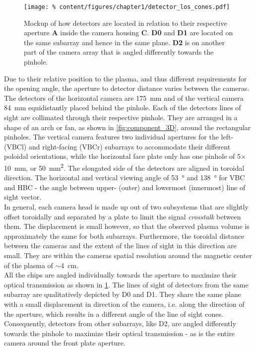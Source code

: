 %
            \begin{figure}[t]%
                \centering%
                \texttt{[image: \%
                    content/figures/chapter1/detector\_los\_cones.pdf]}%
                \caption{Mockup of how detectors are located in relation to their respective aperture \textbf{A} inside the camera housing \textbf{C}. \textbf{D0} and \textbf{D1} are located on the same subarray and hence in the same plane. \textbf{D2} is on another part of the camera array that is angled differently towards the pinhole.}\label{fig:loscones}%
            \end{figure}%
%
            Due to their relative position to the plasma, and thus different requirements for the opening angle, the aperture to detector distance varies between the cameras. The detectors of the horizontal camera are \SI{175}{\milli\meter} and of the vertical camera \SI{84}{\milli\meter} equidistantly placed behind the pinhole. Each of the detectors lines of sight are collimated through their respective pinhole. They are arranged in a shape of an arch or fan, as shown in \cref{fig:component_3D}, around the rectangular pinholes. The vertical camera features two individual apertures for the left- (VBCl) and right-facing (VBCr) subarrays to accommodate their different poloidal orientations, while the horizontal face plate only has one pinhole of 5$\times$\SI{10}{\milli\meter}, or \SI{50}{\milli\meter\squared}. The elongated side of the detectors are aligned in toroidal direction. The horizontal and vertical viewing angle of \SI{53}{\degree} and \SI{138}{\degree} for VBC and HBC - the angle between upper- (outer) and lowermost (innermost) line of sight vector.\\%
            In general, each camera head is made up out of two subsystems that are slightly offset toroidally and separated by a plate to limit the signal \textit{crosstalk} between them. The displacement is small however, so that the observed plasma volume is approximately the same for both subarrays. Furthermore, the toroidal distance between the cameras and the extent of the lines of sight in this direction are small. They are within the cameras spatial resolution around the magnetic center of the plasma of $\sim$\SI{4}{\centi\meter}.\\%
            All the chips are angled individually towards the aperture to maximize their optical transmission as shown in \cref{fig:loscones}. The lines of sight of detectors from the same subarray are qualitatively depicted by D0 and D1. They share the same plane with a small displacement in direction of the camera, i.e. along the direction of the aperture, which results in a different angle of the line of sight cones. Consequently, detectors from other subarrays, like D2, are angled differently towards the pinhole to maximize their optical transmission - as is the entire camera around the front plate aperture.\\%
